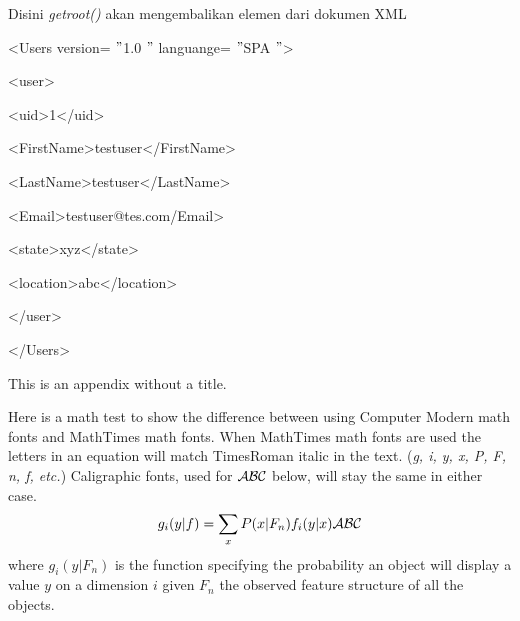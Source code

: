 \documentclass{wileySix}
\begin{document}
\begin{myEnumerate}
{Disini \textit{getroot()} akan mengembalikan elemen dari dokumen XML \par
\vspace{10pt}
\noindent 
{\fontsize{10pt}{10pt}\selectfont <Users version= $ " $1.0 $ " $ languange= $ " $SPA $ " $>} \par
\noindent 
{\fontsize{10pt}{10pt}\selectfont  \hspace*{0.5in} <user>} \par
\noindent 
{\fontsize{10pt}{10pt}\selectfont  \hspace*{0.5in}  \hspace*{0.5in} <uid>1</uid>} \par
\noindent 
{\fontsize{10pt}{10pt}\selectfont  \hspace*{0.5in}  \hspace*{0.5in} <FirstName>testuser</FirstName>} \par
\noindent 
{\fontsize{10pt}{10pt}\selectfont  \hspace*{0.5in}  \hspace*{0.5in} <LastName>testuser</LastName>} \par
\noindent 
{\fontsize{10pt}{10pt}\selectfont  \hspace*{0.5in}  \hspace*{0.5in} <Email>testuser@tes.com/Email>} \par
\noindent 
{\fontsize{10pt}{10pt}\selectfont  \hspace*{0.5in}  \hspace*{0.5in} <state>xyz</state>} \par
\noindent 
{\fontsize{10pt}{10pt}\selectfont  \hspace*{0.5in}  \hspace*{0.5in} <location>abc</location>} \par
\noindent 
{\fontsize{10pt}{10pt}\selectfont  \hspace*{0.5in} </user>} \par
\noindent 
{\fontsize{10pt}{10pt}\selectfont </Users>} \par
\vspace{10pt}

\appendix{}
This is an appendix without a title.

Here is a math test to show the difference between using Computer Modern
math fonts and MathTimes math fonts. When MathTimes math fonts are used
the letters in an equation will match TimesRoman italic in the text.
({\it g, i, y, x, P, F, n, f, etc.}) Caligraphic fonts, used for
$\cal ABC$ below, will stay the same
in either case.
\begin{equation}
g_i(y|f)=\sum_x P(x|F_n)f_i(y|x){\cal ABC}
\end{equation}
where $g_i(y|F_n)$ is the function specifying the probability an object will
display a value $y$ on a dimension $i$ given $F_n$ the observed feature
structure of all the objects.

}
\end{myEnumerate}
\end{document}
